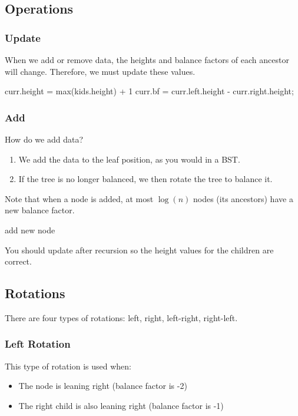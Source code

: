 \documentclass[a4paper]{article}
\begin{document}
\subsection{Operations}
\subsubsection{Update}
When we add or remove data, the heights and balance factors of each ancestor will change. Therefore, we must update these values.

\begin{algorithm}[H]
	curr.height = max(kids.height) + 1\;
	curr.bf = curr.left.height - curr.right.height; 
	\caption{Update} 
\end{algorithm}
\subsubsection{Add}
How do we add data?
\begin{enumerate}
	\item We add the data to the leaf position, as you would in a BST.
	\item If the tree is no longer balanced, we then rotate the tree to balance it.
\end{enumerate}
Note that when a node is added, at most \( \log (n) \) nodes (its ancestors) have a new balance factor.


\begin{algorithm}[H]
	 {
		add new node\;
	}
	\caption{Add}
\end{algorithm}

\begin{note}
You should update after recursion so the height values for the children are correct.
\end{note}

\subsection{Rotations}
There are four types of rotations: left, right, left-right, right-left.
\subsubsection{Left Rotation}
This type of rotation is used when:
\begin{itemize}
	\item The node is leaning right (balance factor is -2)
	\item The right child is also leaning right (balance factor is -1)
\end{itemize}
\end{document}
